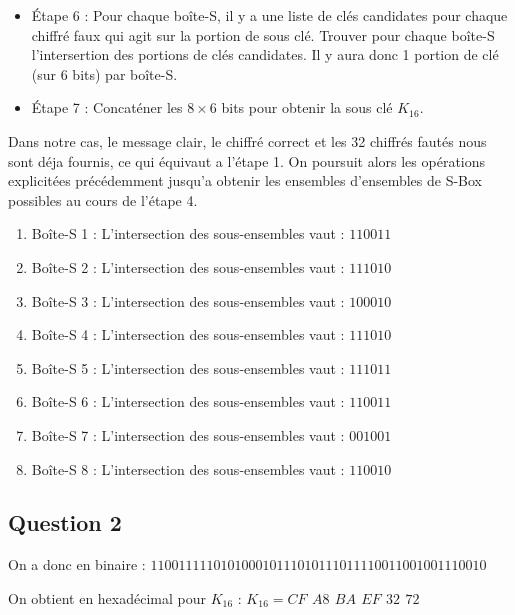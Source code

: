 \documentclass[12pt,a4paper]{report}
\begin{document}
\begin{itemize}
	\item Étape 6 : Pour chaque boîte-S, il y a une liste de clés candidates pour chaque chiffré faux qui agit sur la portion de sous clé. Trouver pour chaque boîte-S l'intersertion des portions de clés candidates. Il y aura donc 1 portion de clé (sur 6 bits) par boîte-S. \newline
	
	\item Étape 7 : Concaténer les $8 \times 6$ bits pour obtenir la sous clé $K_{16}$. 
\end{itemize}


Dans notre cas, le message clair, le chiffré correct et les 32 chiffrés fautés nous sont déja fournis, ce qui équivaut a l'étape 1. On poursuit alors les opérations explicitées précédemment jusqu'a obtenir les ensembles d’ensembles de S-Box possibles au cours de l’étape 4.

\begin{enumerate}
    \item Boîte-S 1 : L’intersection des sous-ensembles vaut : $110011$
    \item Boîte-S 2 : L’intersection des sous-ensembles vaut : $111010$
    \item Boîte-S 3 : L’intersection des sous-ensembles vaut : $100010$
    \item Boîte-S 4 : L’intersection des sous-ensembles vaut : $111010$
    \item Boîte-S 5 : L’intersection des sous-ensembles vaut : $111011$
    \item Boîte-S 6 : L’intersection des sous-ensembles vaut : $110011$
    \item Boîte-S 7 : L’intersection des sous-ensembles vaut : $001001$
    \item Boîte-S 8 : L’intersection des sous-ensembles vaut : $110010$
    
\end{enumerate}

\subsection{Question 2}

On a donc en binaire : $110011111010100010111010111011110011001001110010$ \newline 

On obtient en hexadécimal pour $K_{16}$ :\color{red} \textbf{$K_{16} = CF$ $A8$ $BA$ $EF$ $32$ $72$} \color{black}
\end{document}
